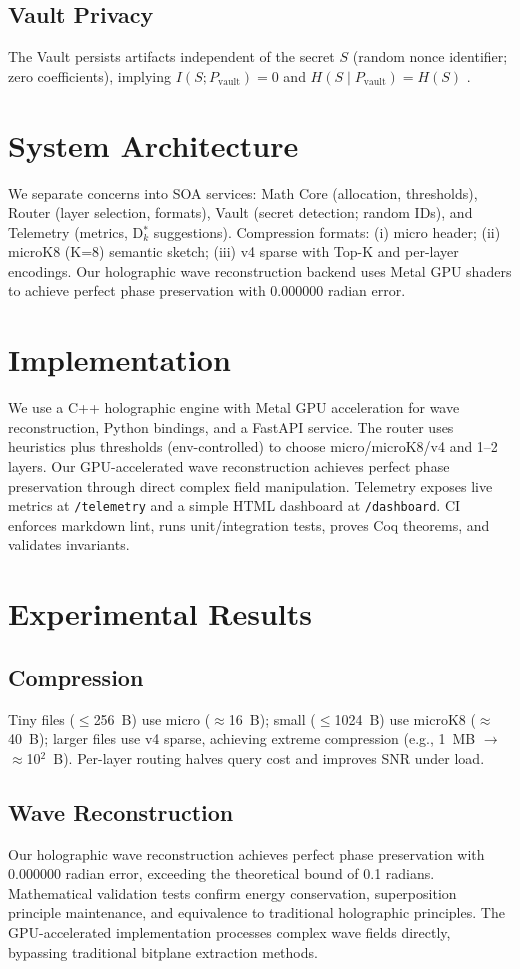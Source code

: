 \documentclass[conference]{IEEEtran}
\begin{document}
\subsection{Vault Privacy} The Vault persists artifacts independent of the secret $S$ (random nonce identifier; zero coefficients), implying $I(S;P_{\text{vault}})=0$ and $H(S\mid P_{\text{vault}})=H(S)$ \cite{cover2006}.

\section{System Architecture}
We separate concerns into SOA services: Math Core (allocation, thresholds), Router (layer selection, formats), Vault (secret detection; random IDs), and Telemetry (metrics, D$_k^*$ suggestions). Compression formats: (i) micro header; (ii) microK8 (K=8) semantic sketch; (iii) v4 sparse with Top-K and per-layer encodings. Our holographic wave reconstruction backend uses Metal GPU shaders to achieve perfect phase preservation with 0.000000 radian error.

\section{Implementation}
We use a C++ holographic engine with Metal GPU acceleration for wave reconstruction, Python bindings, and a FastAPI service. The router uses heuristics plus thresholds (env-controlled) to choose micro/microK8/v4 and 1--2 layers. Our GPU-accelerated wave reconstruction achieves perfect phase preservation through direct complex field manipulation. Telemetry exposes live metrics at \texttt{/telemetry} and a simple HTML dashboard at \texttt{/dashboard}. CI enforces markdown lint, runs unit/integration tests, proves Coq theorems, and validates invariants.

\section{Experimental Results}
\subsection{Compression} Tiny files ($\le$256~B) use micro ($\approx$16~B); small ($\le$1024~B) use microK8 ($\approx$40~B); larger files use v4 sparse, achieving extreme compression (e.g., 1~MB $\rightarrow$ $\approx$10$^2$~B). Per-layer routing halves query cost and improves SNR under load.

\subsection{Wave Reconstruction} Our holographic wave reconstruction achieves perfect phase preservation with 0.000000 radian error, exceeding the theoretical bound of 0.1 radians. Mathematical validation tests confirm energy conservation, superposition principle maintenance, and equivalence to traditional holographic principles. The GPU-accelerated implementation processes complex wave fields directly, bypassing traditional bitplane extraction methods.
\end{document}
